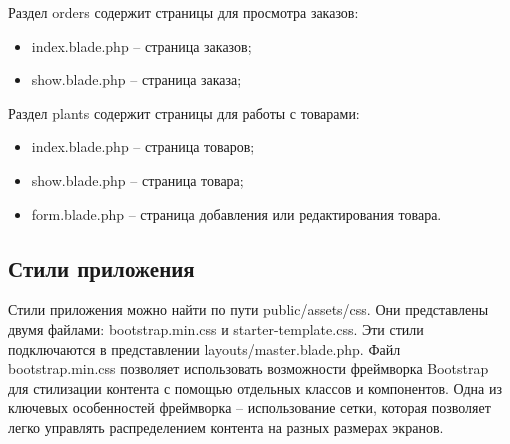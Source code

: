 Раздел orders содержит страницы для просмотра заказов:
\begin{itemize}
	\item index.blade.php – страница заказов;
	\item show.blade.php – страница заказа;
\end{itemize}

Раздел plants содержит страницы для работы с товарами:
\begin{itemize}
	\item index.blade.php – страница товаров;
	\item show.blade.php – страница товара;
	\item form.blade.php – страница добавления или редактирования товара.
\end{itemize}

\subsection{Стили приложения}
Стили приложения можно найти по пути public/assets/css. Они представлены двумя файлами: bootstrap.min.css и starter-template.css. Эти стили подключаются в представлении layouts/master.blade.php. Файл bootstrap.min.css позволяет использовать возможности фреймворка Bootstrap для стилизации контента с помощью отдельных классов и компонентов. Одна из ключевых особенностей фреймворка – использование сетки, которая позволяет легко управлять распределением контента на разных размерах экранов.
